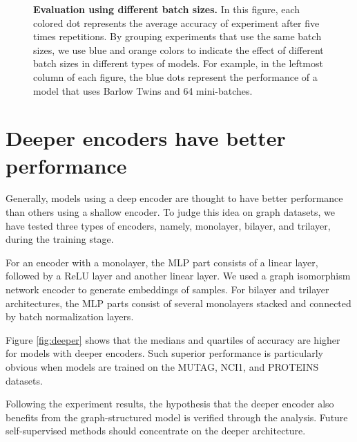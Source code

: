 \begin{figure}[htbp]
\vspace{0.5cm}
\caption[Evaluation using different batch sizes]{\textbf{Evaluation using different batch sizes.} In this figure, each colored dot represents the average accuracy of experiment after five times repetitions. By grouping experiments that use the same batch sizes, we use blue and orange colors to indicate the effect of different batch sizes in different types of models. For example, in the leftmost column of each figure, the blue dots represent the performance of a model that uses Barlow Twins and 64 mini-batches.} \label{fig:simclrbatch}
\end{figure}








\section{Deeper encoders have better performance}

Generally, models using a deep encoder are thought to have better performance than others using a shallow encoder. To judge this idea on graph datasets, we have tested three types of encoders, namely, monolayer, bilayer, and trilayer, during the training stage. 

For an encoder with a monolayer, the MLP part consists of a linear layer, followed by a ReLU layer and another linear layer. We used a graph isomorphism network encoder to generate embeddings of samples. For bilayer and trilayer architectures, the MLP parts consist of several monolayers stacked and connected by batch normalization layers.

Figure \ref{fig:deeper} shows that the medians and quartiles of accuracy are higher for models with deeper encoders. Such superior performance is particularly obvious when models are trained on the MUTAG, NCI1, and PROTEINS datasets.

Following the experiment results, the hypothesis that the deeper encoder also benefits from the graph-structured model is verified through the analysis. Future self-supervised methods should concentrate on the deeper architecture.


